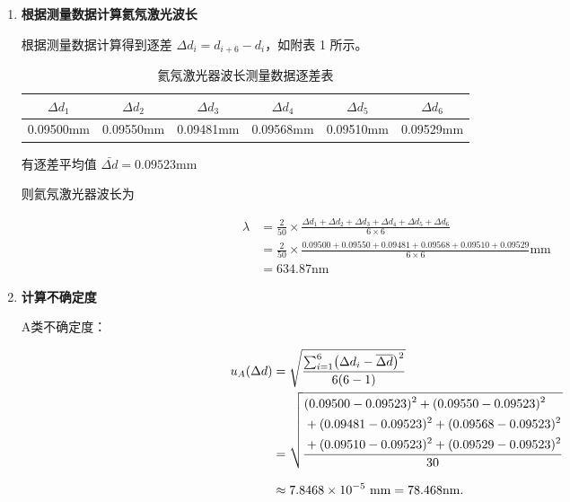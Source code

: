 \documentclass[12pt,a4paper]{article}
\begin{document}
	\begin{enumerate}
		
	\item \textbf{根据测量数据计算氦氖激光波长}
	
	根据测量数据计算得到逐差 $\Delta d_i = d_{i+6}-d_i$，如附表 1 所示。
	
	\begin{table}[H]
		\centering
		\renewcommand{\arraystretch}{1.3} %
		\begin{tabular}{|c|c|c|c|c|c|}
			\hline
			$\Delta d_1$     & $\Delta d_2$     & $\Delta d_3$     & $\Delta d_4$     & $\Delta d_5$     & $\Delta d_6$  \\ \hline
			0.09500mm  &   0.09550mm  & 0.09481mm  & 0.09568mm  & 0.09510mm & 0.09529mm  \\ \hline
		\end{tabular}
		\caption{氦氖激光器波长测量数据逐差表} %
		\label{tab:wave_length_data} %
	\end{table}

	有逐差平均值 $\bar{\Delta d} = 0.09523$mm

	则氦氖激光器波长为
	
	\begin{align*}
		\lambda &=\frac{2}{50} \times \frac{\Delta d_1 + \Delta d_2 + \Delta d_3 + \Delta d_4 + \Delta d_5 + \Delta d_6}{6 \times 6} \\
		&=\frac{2}{50}\times\frac{0.09500+0.09550+0.09481+0.09568+0.09510+0.09529}{6\times 6}\mathrm{mm} \\
		&=634.87\mathrm{nm}
	\end{align*}
	
	\item \textbf{计算不确定度}
	
	A类不确定度：

\begin{equation}
	\begin{aligned}
		u_{A}({\Delta d})
		&=\sqrt{\frac{\sum_{i=1}^{6}\bigl(\Delta d_i-\overline{\Delta d}\bigr)^{2}}{6(6-1)}} \\
		&=\sqrt{\frac{%
				\begin{aligned}
					& (0.09500-0.09523)^{2}+(0.09550-0.09523)^{2}\\
					&+(0.09481-0.09523)^{2}+(0.09568-0.09523)^{2}\\
					&+(0.09510-0.09523)^{2}+(0.09529-0.09523)^{2}
			\end{aligned}}
			{30}} \\[8pt]
		&\approx 7.8468\times10^{-5}\ \text{mm} = 78.468\text{nm}.
	\end{aligned}
\end{equation}
	

\end{enumerate}
\end{document}
